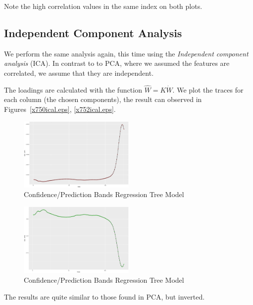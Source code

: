 \documentclass[a4paper, twocolumn]{article}
\begin{document}
        Note the high correlation values in the same index on both plots.


    \subsection*{Independent Component Analysis}

        We perform the same analysis again, this time using the \emph{Independent component analysis} (ICA). In contrast to to PCA, where we assumed the features are correlated, we assume that they are independent. 

        The loadings are calculated with the function \( \hat{W} = K \dot W \). We plot the traces for each column (the chosen components), the result can observed in Figures~\ref{x750ical.eps}, \ref{x752ical.eps}.

        \begin{figure}[h!]
            \centering
            \caption{Confidence/Prediction Bands Regression Tree Model}
            \label{fig:x750ical}
            \includegraphics[width=0.5\textwidth]{share/A2_trace_ICA1.eps}
        \end{figure}

        \begin{figure}[h!]
            \centering
            \caption{Confidence/Prediction Bands Regression Tree Model}
            \label{fig:x752ical}
            \includegraphics[width=0.5\textwidth]{share/A2_trace_ICA2.eps}
        \end{figure}

        The results are quite similar to those found in PCA, but inverted.
\end{document}
